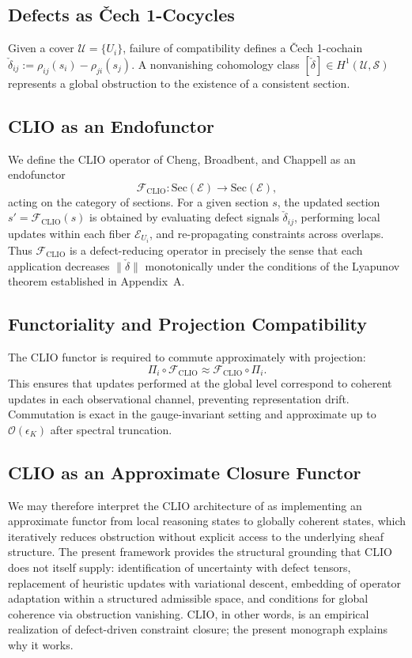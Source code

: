 \documentclass[12pt, oneside]{article}
\begin{document}
\subsection{Defects as \v{C}ech 1-Cocycles}

Given a cover $\mathcal{U} = \{U_i\}$, failure of compatibility defines a \v{C}ech 1-cochain $\check{\delta}_{ij} := \rho_{ij}(s_i) - \rho_{ji}(s_j)$. A nonvanishing cohomology class $[\check{\delta}] \in H^1(\mathcal{U}, \mathcal{S})$ represents a global obstruction to the existence of a consistent section.

\subsection{CLIO as an Endofunctor}

We define the CLIO operator of Cheng, Broadbent, and Chappell \cite{cheng2025clio} as an endofunctor
\[
\mathcal{F}_{\mathrm{CLIO}} : \mathrm{Sec}(\mathcal{E}) \to \mathrm{Sec}(\mathcal{E}),
\]
acting on the category of sections. For a given section $s$, the updated section $s' = \mathcal{F}_{\mathrm{CLIO}}(s)$ is obtained by evaluating defect signals $\check{\delta}_{ij}$, performing local updates within each fiber $\mathcal{E}_{U_i}$, and re-propagating constraints across overlaps. Thus $\mathcal{F}_{\mathrm{CLIO}}$ is a defect-reducing operator in precisely the sense that each application decreases $\|\check{\delta}\|$ monotonically under the conditions of the Lyapunov theorem established in Appendix~A.

\subsection{Functoriality and Projection Compatibility}

The CLIO functor is required to commute approximately with projection:
\[
\Pi_i \circ \mathcal{F}_{\mathrm{CLIO}} \approx \mathcal{F}_{\mathrm{CLIO}} \circ \Pi_i.
\]
This ensures that updates performed at the global level correspond to coherent updates in each observational channel, preventing representation drift. Commutation is exact in the gauge-invariant setting and approximate up to $\mathcal{O}(\epsilon_K)$ after spectral truncation.

\subsection{CLIO as an Approximate Closure Functor}

We may therefore interpret the CLIO architecture of \cite{cheng2025clio} as implementing an approximate functor from local reasoning states to globally coherent states, which iteratively reduces obstruction without explicit access to the underlying sheaf structure. The present framework provides the structural grounding that CLIO does not itself supply: identification of uncertainty with defect tensors, replacement of heuristic updates with variational descent, embedding of operator adaptation within a structured admissible space, and conditions for global coherence via obstruction vanishing. CLIO, in other words, is an empirical realization of defect-driven constraint closure; the present monograph explains why it works.
\end{document}
